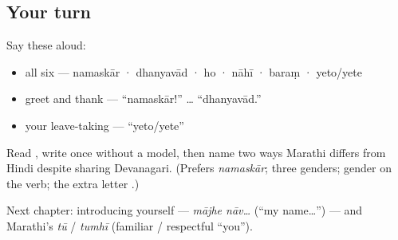 \subsection*{Your turn}
Say these aloud:

\begin{itemize}
\raggedright
  \item all six — namaskār · dhanyavād · ho · nāhī · baraṃ · yeto/yete
  \item greet and thank — \textquotedblleft{}namaskār!\textquotedblright{} … \textquotedblleft{}dhanyavād.\textquotedblright{}
  \item your leave-taking — \textquotedblleft{}yeto/yete\textquotedblright{}
\end{itemize}

\begin{tcolorbox}[breakable,colback=teal!4,colframe=teal!35!black,title={Before you move on}]
Read \textbf{}, write \textbf{} once without a model, then name two ways Marathi differs from Hindi despite sharing Devanagari. (Prefers \emph{namaskār}; three genders; gender on the verb; the extra letter \emph{}.)

Next chapter: introducing yourself — \emph{mājhe nāv…} (\textquotedblleft{}my name…\textquotedblright{}) — and Marathi's \emph{tū} / \emph{tumhī} (familiar / respectful \textquotedblleft{}you\textquotedblright{}).
\end{tcolorbox}
